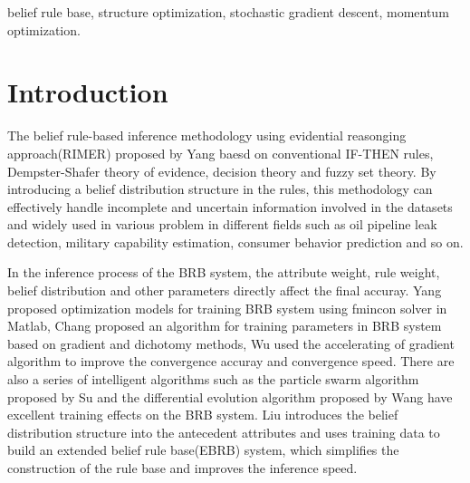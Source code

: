 \documentclass{ieeeaccess}
\begin{document}
\begin{keywords}
    belief rule base, structure optimization, stochastic gradient descent, momentum optimization.
\end{keywords}

\titlepgskip=-15pt

\maketitle

\section{Introduction}
\label{sec:introduction}

The belief rule-based inference methodology using evidential reasonging approach(RIMER) proposed by Yang\cite{a1}
baesd on conventional IF-THEN rules\cite{a2}, Dempster-Shafer theory of evidence\cite{a3,a4}, decision theory\cite{a5}
and fuzzy set theory\cite{a6}. By introducing a belief distribution structure in the rules, this methodology can
effectively handle incomplete and uncertain information involved in the datasets and widely used in various problem in
different fields such as oil pipeline leak detection\cite{a7}, military capability estimation\cite{a8}, consumer behavior
prediction\cite{a9} and so on.

In the inference process of the BRB system, the attribute weight, rule weight, belief distribution and other parameters
directly affect the final accuray. Yang\cite{a10} proposed optimization models for training BRB system using fmincon solver in
Matlab, Chang\cite{a11,a12} proposed an algorithm for training parameters in BRB system based on gradient and dichotomy methods,
Wu\cite{a13} used the accelerating of gradient algorithm to improve the convergence accuray and convergence speed. There are also
a series of intelligent algorithms such as the particle swarm algorithm proposed by Su\cite{a14} and the differential evolution
algorithm proposed by Wang\cite{a15} have excellent training effects on the BRB system. Liu\cite{a16} introduces the belief distribution
structure into the antecedent attributes and uses training data to build an extended belief rule base(EBRB) system, which simplifies the construction of
the rule base and improves the inference speed.
\end{document}
